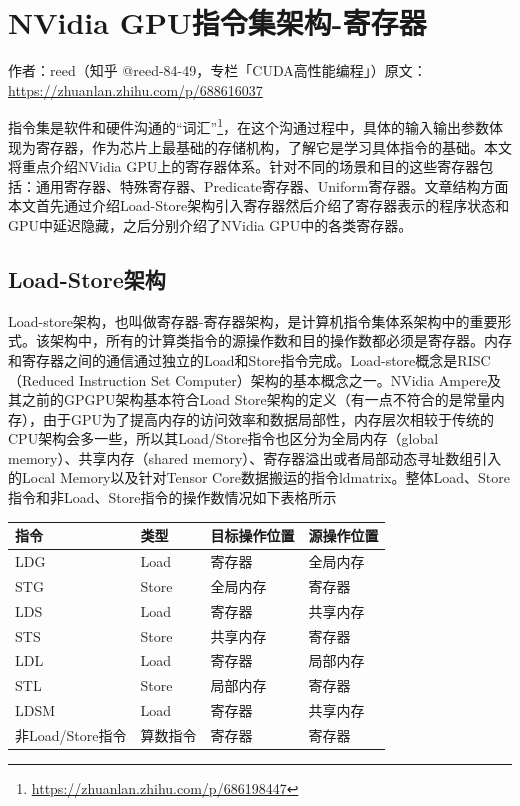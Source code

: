 \chapter{NVidia GPU指令集架构-寄存器}

\begin{center}\small 作者：reed（知乎 @reed-84-49，专栏「CUDA高性能编程」）\quad 原文：\url{https://zhuanlan.zhihu.com/p/688616037}\end{center}

指令集是软件和硬件沟通的“词汇”\footnote{\url{https://zhuanlan.zhihu.com/p/686198447}}，在这个沟通过程中，具体的输入输出参数体现为寄存器，作为芯片上最基础的存储机构，了解它是学习具体指令的基础。本文将重点介绍NVidia GPU上的寄存器体系。针对不同的场景和目的这些寄存器包括：通用寄存器、特殊寄存器、Predicate寄存器、Uniform寄存器。文章结构方面本文首先通过介绍Load-Store架构引入寄存器然后介绍了寄存器表示的程序状态和GPU中延迟隐藏，之后分别介绍了NVidia GPU中的各类寄存器。

\section{Load-Store架构}

Load-store架构，也叫做寄存器-寄存器架构，是计算机指令集体系架构中的重要形式。该架构中，所有的计算类指令的源操作数和目的操作数都必须是寄存器。内存和寄存器之间的通信通过独立的Load和Store指令完成。Load-store概念是RISC（Reduced Instruction Set Computer）架构的基本概念之一。NVidia Ampere及其之前的GPGPU架构基本符合Load Store架构的定义（有一点不符合的是常量内存），由于GPU为了提高内存的访问效率和数据局部性，内存层次相较于传统的CPU架构会多一些，所以其Load/Store指令也区分为全局内存（global memory）、共享内存（shared memory）、寄存器溢出或者局部动态寻址数组引入的Local Memory以及针对Tensor Core数据搬运的指令ldmatrix。整体Load、Store指令和非Load、Store指令的操作数情况如下表格所示

\begin{table}[htbp]
\centering
\begin{tabular}{llll}
\toprule
指令 & 类型 & 目标操作位置 & 源操作位置 \\
\midrule
LDG & Load & 寄存器 & 全局内存 \\
STG & Store & 全局内存 & 寄存器 \\
LDS & Load & 寄存器 & 共享内存 \\
STS & Store & 共享内存 & 寄存器 \\
LDL & Load & 寄存器 & 局部内存 \\
STL & Store & 局部内存 & 寄存器 \\
LDSM & Load & 寄存器 & 共享内存 \\
非Load/Store指令 & 算数指令 & 寄存器 & 寄存器 \\
\bottomrule
\end{tabular}
\end{table}

